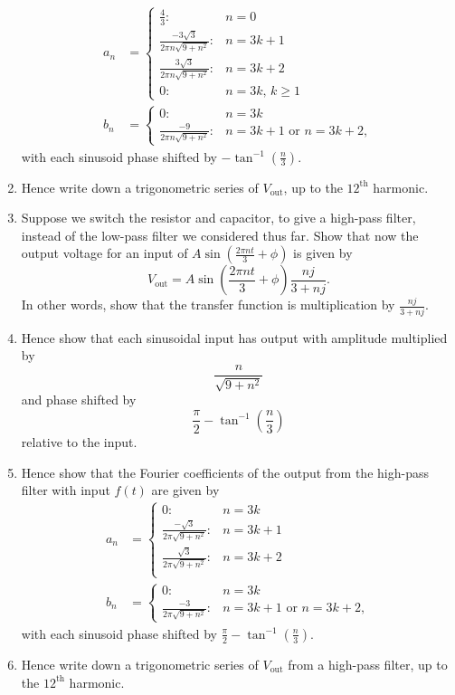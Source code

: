 \documentclass{article}
\begin{document}
\begin{enumerate}
\begin{align*}
			a_n &=\begin{cases}
					\frac{4}{3}: & n=0\\
					\frac{-3\sqrt{3}}{2\pi n\sqrt{9+n^2}}: & n=3k+1\\
					\frac{3\sqrt{3}}{2\pi n\sqrt{9+n^2}}: & n=3k+2\\
					0: & n=3k,\, k\geq 1
				\end{cases}\\
			b_n&=\begin{cases}
					0: & n=3k\\
					\frac{-9}{2\pi n\sqrt{9+n^2}}: & n=3k+1\mbox{ or } n=3k+2,
				\end{cases}
		\end{align*}
		with each sinusoid phase shifted by $-\tan^{-1}\left(\frac{n}{3}\right).$
	\item Hence write down a trigonometric series of $V_\mathrm{out}$, up to the $12^\mathrm{th}$ harmonic.
	\item Suppose we switch the resistor and capacitor, to give a high-pass filter, instead of the low-pass filter we considered thus far. Show that now the output voltage for an input of $A\sin\left(\frac{2\pi nt}{3}+\phi\right)$ is given by
		\[V_\mathrm{out}=A\sin\left(\frac{2\pi nt}{3}+\phi\right)\frac{nj}{3+nj}.\]
		In other words, show that the transfer function is multiplication by $\frac{nj}{3+nj}$.
	\item Hence show that each sinusoidal input has output with amplitude multiplied by
		\[\frac{n}{\sqrt{9+n^2}}\]
		and phase shifted by
		\[\frac{\pi}{2}-\tan^{-1}\left(\frac{n}{3}\right)\]
		relative to the input.
	\item Hence show that the Fourier coefficients of the output from the high-pass filter with input $f(t)$ are given by
		\begin{align*}
			a_n &=\begin{cases}
					0: & n=3k\\
					\frac{-\sqrt{3}}{2\pi \sqrt{9+n^2}}: & n=3k+1\\
					\frac{\sqrt{3}}{2\pi \sqrt{9+n^2}}: & n=3k+2\\
				\end{cases}\\
			b_n&=\begin{cases}
					0: & n=3k\\
					\frac{-3}{2\pi \sqrt{9+n^2}}: & n=3k+1\mbox{ or } n=3k+2,
				\end{cases}
		\end{align*}
		with each sinusoid phase shifted by $\frac{\pi}{2}-\tan^{-1}\left(\frac{n}{3}\right).$
	\item Hence write down a trigonometric series of $V_\mathrm{out}$ from a high-pass filter, up to the $12^\mathrm{th}$ harmonic.
\end{enumerate}\bigskip
\end{document}
